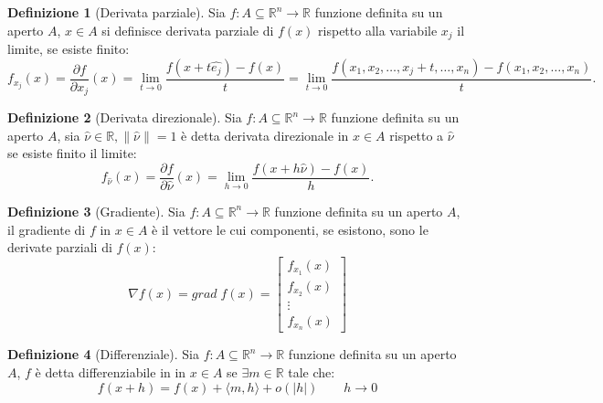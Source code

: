 \documentclass[leqno]{article}
\theoremstyle{definition}
\newtheorem{definition}{Definizione}[section]
\numberwithin{equation}{section}
\theoremstyle{remark}
\begin{document}
	\begin{definition}[Derivata parziale]
		Sia $f:A\subseteq \mathbb{R}^n \rightarrow \mathbb{R}$ funzione definita su un aperto $A$, $ {x} \in A$ si definisce derivata parziale di $f(x)$ rispetto alla variabile $x_j$ il limite, se esiste finito: 
		\begin{equation}
			f_{x_j}(x)={\frac {\partial f}{\partial x_{j}}}(  {x} )=\lim _{t\to 0}{\frac {f(  {x} +t  \hat{e_{j}})-f(  {x} )}{t}}=\lim _{t\to 0}{\frac {f(x_{1},x_{2},\dots, x_{j}+t,\dots ,x_{n})-f(x_{1},x_{2},\dots ,x_{n})}{t}}.
		\end{equation}
	\end{definition}
	\begin{definition}[Derivata direzionale]
		Sia $f:A\subseteq \mathbb{R}^n \rightarrow \mathbb{R}$ funzione definita su un aperto $A$, sia $\hat{\nu} \in \mathbb{R}, \lVert \hat{\nu} \rVert = 1$ è detta derivata direzionale in $ {x} \in A$ rispetto a $\hat{\nu}$ se esiste finito il limite:
		\begin{equation}
			f_{\hat{\nu}}(x)={\frac {\partial f}{\partial \hat{\nu}}(  {x} )=\lim _{h\rightarrow 0}{\frac {f( x +h  \hat{\nu} )-f( {x} )}{h}}.}
		\end{equation}
	\end{definition}
	\begin{definition}[Gradiente]
		Sia $f:A\subseteq \mathbb{R}^n \rightarrow \mathbb{R}$ funzione definita su un aperto $A$, il gradiente di $f$ in $ {x} \in A$ è il vettore le cui componenti, se esistono, sono le derivate parziali di $f(x)$:
		\begin{equation}
			\nabla f(x) =grad \; f(x) = \begin{bmatrix}
				f_{x_1}(x)\\ f_{x_2}(x)\\\vdots \\f_{x_n}(x)
			\end{bmatrix}
		\end{equation}
	\end{definition}
	\begin{definition}[Differenziale]
		Sia $f:A\subseteq \mathbb{R}^n \rightarrow \mathbb{R}$ funzione definita su un aperto $A$, $f$ è detta differenziabile in in $ {x} \in A$ se $\exists m \in \mathbb{R}$ tale che: 
		\begin{equation}
			f(x+h)=f(x)+\langle m , h \rangle + o(|h|) \quad \quad h\rightarrow 0
		\end{equation}
	\end{definition}
	
\end{document}
